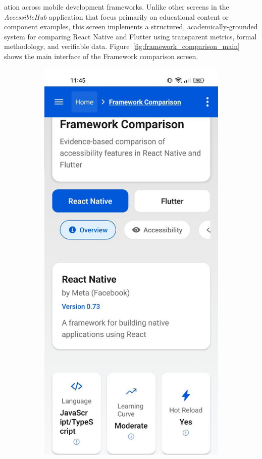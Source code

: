 ation across mobile development frameworks. Unlike other screens in the \textit{AccessibleHub} application that focus primarily on educational content or component examples, this screen implements a structured, academically-grounded system for comparing React Native and Flutter using transparent metrics, formal methodology, and verifiable data. Figure~\ref{fig:framework_comparison_main} shows the main interface of the Framework comparison screen.

\begin{figure}[ht]
    \centering
    \begin{subfigure}[b]{0.48\textwidth}
        \centering
        \includegraphics[width=\linewidth, alt={Framework comparison screen with React Native selected}]{img/overview1.jpg}

\end{subfigure}
\end{figure}
